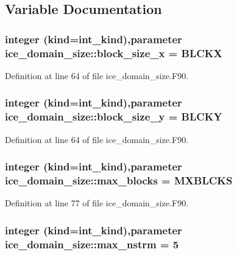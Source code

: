 \subsection{Variable Documentation}
\hypertarget{namespaceice__domain__size_a6e6f2cb739480c307cb4a416f6cde96f}{
\subsubsection[{block\_\-size\_\-x}]{\setlength{\rightskip}{0pt plus 5cm}integer (kind=int\_\-kind),parameter {\bf ice\_\-domain\_\-size::block\_\-size\_\-x} = BLCKX}}
\label{namespaceice__domain__size_a6e6f2cb739480c307cb4a416f6cde96f}


Definition at line 64 of file ice\_\-domain\_\-size.F90.\hypertarget{namespaceice__domain__size_a7b805f9f706b3843b3b4da02974a2654}{
\subsubsection[{block\_\-size\_\-y}]{\setlength{\rightskip}{0pt plus 5cm}integer (kind=int\_\-kind),parameter {\bf ice\_\-domain\_\-size::block\_\-size\_\-y} = BLCKY}}
\label{namespaceice__domain__size_a7b805f9f706b3843b3b4da02974a2654}


Definition at line 64 of file ice\_\-domain\_\-size.F90.\hypertarget{namespaceice__domain__size_abb7c0f274dd4e8ef1b66bc8785478941}{
\subsubsection[{max\_\-blocks}]{\setlength{\rightskip}{0pt plus 5cm}integer (kind=int\_\-kind),parameter {\bf ice\_\-domain\_\-size::max\_\-blocks} = MXBLCKS}}
\label{namespaceice__domain__size_abb7c0f274dd4e8ef1b66bc8785478941}


Definition at line 77 of file ice\_\-domain\_\-size.F90.\hypertarget{namespaceice__domain__size_a5b7e71626d60541574b8431d717d2c42}{
\subsubsection[{max\_\-nstrm}]{\setlength{\rightskip}{0pt plus 5cm}integer (kind=int\_\-kind),parameter {\bf ice\_\-domain\_\-size::max\_\-nstrm} = 5}}
\label{namespaceice__domain__size_a5b7e71626d60541574b8431d717d2c42}


